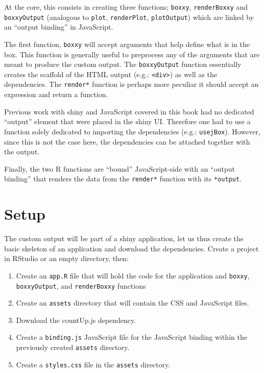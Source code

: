 \documentclass[
]{krantz}
\providecommand{\tightlist}{%
  \setlength{\itemsep}{0pt}\setlength{\parskip}{0pt}}
\begin{document}
At the core, this consists in creating three functions; \texttt{boxxy}, \texttt{renderBoxxy} and \texttt{boxxyOutput} (analogous to \texttt{plot}, \texttt{renderPlot}, \texttt{plotOutput}) which are linked by an ``output binding'' in JavaScript.

The first function, \texttt{boxxy} will accept arguments that help define what is in the box. This function is generally useful to preprocess any of the arguments that are meant to produce the custom output. The \texttt{boxxyOutput} function essentially creates the scaffold of the HTML output (e.g.: \texttt{\textless{}div\textgreater{}}) as well as the dependencies. The \texttt{render*} function is perhaps more peculiar it should accept an expression and return a function.

Previous work with shiny and JavaScript covered in this book had no dedicated ``output'' element that were placed in the shiny UI. Therefore one had to use a function solely dedicated to importing the dependencies (e.g.: \texttt{usejBox}). However, since this is not the case here, the dependencies can be attached together with the output.

Finally, the two R functions are ``bound'' JavaScript-side with an ``output binding'' that renders the data from the \texttt{render*} function with its \texttt{*output}.

\hypertarget{shiny-output-setup}{%
\section{Setup}\label{shiny-output-setup}}

The custom output will be part of a shiny application, let us thus create the basic skeleton of an application and download the dependencies. Create a project in RStudio or an empty directory, then:

\begin{enumerate}
\def\labelenumi{\arabic{enumi}.}
\tightlist
\item
  Create an \texttt{app.R} file that will hold the code for the application and \texttt{boxxy}, \texttt{boxxyOutput}, and \texttt{renderBoxxy} functions
\item
  Create an \texttt{assets} directory that will contain the CSS and JavaScript files.
\item
  Download the countUp.js dependency.
\item
  Create a \texttt{binding.js} JavaScript file for the JavaScript binding within the previously created \texttt{assets} directory.
\item
  Create a \texttt{styles.css} file in the \texttt{assets} directory.
\end{enumerate}
\end{document}
